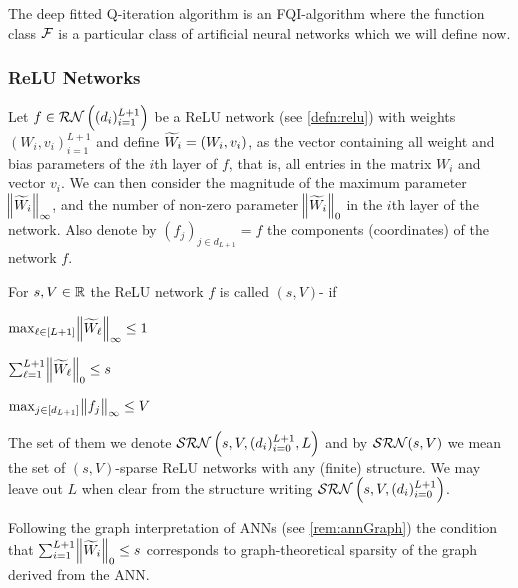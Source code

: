 The deep fitted Q-iteration algorithm is an FQI-algorithm where the
function class $\mathcal{F}$ is a particular class of artificial neural networks
which we will define now.

\subsubsection{ReLU Networks}
Let $f \in \mathcal{RN}\left((d_i)_{i=1}^{L+1} \right)$ be a
ReLU network (see \cref{defn:relu})
with weights $(W_i, v_i)_{i=1}^{L+1}$
and define $\widetilde{W}_i = (W_i, v_i)$, 
as the vector containing all weight and bias parameters of the $i$th layer
of $f$,
that is, all entries in the matrix $W_i$ and vector $v_i$.
We can then consider the magnitude of the maximum parameter
$\norm{\widetilde{W}_i}_\infty$,
and the number of non-zero parameter $\norm{\widetilde{W}_i}_0$
in the $i$th layer of the network.
Also denote by $(f_j)_{j \in d_{L+1}} = f$ the components (coordinates)
of the network $f$.

\begin{defn}
  For $s,V \in \mathbb{R}$ the ReLU network $f$
  is called $(s,V)$- if
  \begin{center}
    \begin{enumerate*}[label=\arabic*., itemjoin=\hspace{0.3in}]
      \item $\max_{\ell \in [L+1]} \norm{\widetilde{W}_\ell}_\infty \leq 1$
      \item $\sum_{\ell = 1}^{L+1} \norm{\widetilde{W}_\ell}_0 \leq s$
      \item $\max_{j \in [d_{L+1}]} \norm{f_j}_\infty \leq V$
    \end{enumerate*}
  \end{center}
  The set of them we denote $\mathcal{SRN}\left(s, V, (d_i)_{i=0}^{L+1}, L \right)$
  and by $\mathcal{SRN}(s, V)$ we mean the set of $(s, V)$-sparse ReLU networks
  with any (finite) structure.
  We may leave out $L$ when clear from the structure writing
  $\mathcal{SRN}\left(s, V, (d_i)_{i=0}^{L+1} \right)$.
  \label{defn:sparseReLU}
\end{defn}

\begin{rem}
  Following the graph interpretation of ANNs (see \cref{rem:annGraph})
  the condition that
  $\sum_{i=1}^{L+1} \norm{\widetilde{W}_i}_0 \leq s$
  corresponds to graph-theoretical sparsity of the graph derived from
  the ANN.
\end{rem}


